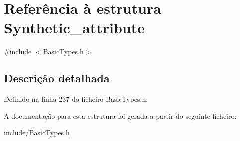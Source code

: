 \hypertarget{structSynthetic__attribute}{}\section{Referência à estrutura Synthetic\+\_\+attribute}
\label{structSynthetic__attribute}


{\ttfamily \#include $<$Basic\+Types.\+h$>$}



\subsection{Descrição detalhada}


Definido na linha 237 do ficheiro Basic\+Types.\+h.



A documentação para esta estrutura foi gerada a partir do seguinte ficheiro\+:\begin{DoxyCompactItemize}
\item 
include/\hyperlink{BasicTypes_8h}{Basic\+Types.\+h}\end{DoxyCompactItemize}
